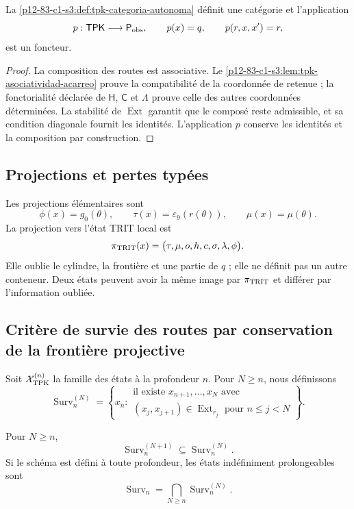 {\begin{theorem}
\label{p12-83-c1-s3:thm:tpk-es-categoria}
La \cref{p12-83-c1-s3:def:tpk-categoria-autonoma} définit une catégorie et l’application
\[
 p:\mathsf{TPK}\longrightarrow\mathsf P_{\rm obs},
 \qquad p(x)=q,\qquad p(r,x,x')=r,
\]
est un foncteur.
\end{theorem}

\begin{proof}
La composition des routes est associative. Le
\cref{p12-83-c1-s3:lem:tpk-asociatividad-acarreo} prouve la compatibilité de la
coordonnée de retenue ; la fonctorialité déclarée de \(\mathsf H\),
\(\mathsf C\) et \(\Lambda\) prouve celle des autres coordonnées
déterminées. La stabilité de \(\operatorname{Ext}\) garantit que le
composé reste admissible, et sa condition diagonale fournit les
identités. L’application \(p\) conserve les identités et la composition par
construction.
\end{proof}

\subsection{Projections et pertes typées}

Les projections élémentaires sont
\[
 \phi(x)=g_0(\theta),
 \qquad
 \tau(x)=\varepsilon_9(r(\theta)),
 \qquad
 \mu(x)=\mu(\theta).
\]
La projection vers l’état TRIT local est
\[
 \pi_{\rm TRIT}(x)
 =\bigl(\tau,\mu,o,h,c,\sigma,\lambda,\phi\bigr).
\]
Elle oublie le cylindre, la frontière et une partie de \(q\) ; elle ne définit pas un autre conteneur.
Deux états peuvent avoir la même image par \(\pi_{\rm TRIT}\) et différer
par l’information oubliée.

\subsection{Critère de survie des routes par conservation de la frontière projective}

Soit \(\mathcal X_{\rm TPK}^{(n)}\) la famille des états à la profondeur
\(n\). Pour \(N\geq n\), nous définissons
\[
 \operatorname{Surv}_n^{(N)}=
 \left\{x_n:
 \begin{array}{l}
 \text{il existe }x_{n+1},\ldots,x_N\text{ avec}\\
 (x_j,x_{j+1})\in\operatorname{Ext}_{r_j}
 \text{ pour }n\leq j<N
 \end{array}\right\}.
\]

\begin{proposition}
\label{p12-83-c1-s3:prop:tpk-filtracion-supervivencia}
Pour \(N\geq n\),
\[
 \operatorname{Surv}_n^{(N+1)}
 \subseteq
 \operatorname{Surv}_n^{(N)}.
\]
Si le schéma est défini à toute profondeur, les états
indéfiniment prolongeables sont
\[
 \operatorname{Surv}_n
 =\bigcap_{N\geq n}\operatorname{Surv}_n^{(N)}.
\]
\end{proposition}

}
